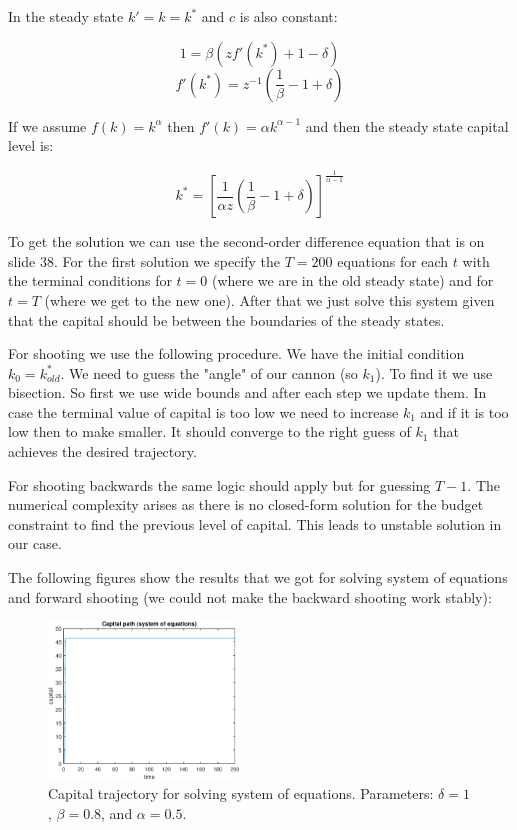\documentclass[12pt]{article}
\newcommand{\?}{\stackrel{?}{=}}
\begin{document}
In the steady state $k'=k=k^*$ and $c$ is also constant:

\[
1 = \beta (zf'(k^*) + 1 - \delta)
\]
\[
f'(k^*) = z^{-1} \left( \frac{1}{\beta} - 1 + \delta \right)
\]

If we assume $f(k) = k^\alpha$ then $f'(k) = \alpha k^{\alpha-1}$ and then the steady state capital level is:

\[
k^* = \left[ \frac{1}{\alpha z} \left( \frac{1}{\beta} - 1 + \delta \right) \right]^{\frac{1}{\alpha-1}}
\]

To get the solution we can use the second-order difference equation that is on slide 38. For the first solution we specify the $T=200$ equations for each $t$ with the terminal conditions for $t=0$ (where we are in the old steady state) and for $t=T$ (where we get to the new one). After that we just solve this system given that the capital should be between the boundaries of the steady states.

For shooting we use the following procedure. We have the initial condition $k_0 = k^*_{old}$. We need to guess the "angle" of our cannon (so $k_1$). To find it we use bisection. So first we use wide bounds and after each step we update them. In case the terminal value of capital is too low we need to increase $k_1$ and if it is too low then to make smaller. It should converge to the right guess of $k_1$ that achieves the desired trajectory.

For shooting backwards the same logic should apply but for guessing $T-1$. The numerical complexity arises as there is no closed-form solution for the budget constraint to find the previous level of capital. This leads to unstable solution in our case.

The following figures show the results that we got for solving system of equations and forward shooting (we could not make the backward shooting work stably):

\begin{figure}[H]
    \centering
    \includegraphics[width=0.45\textwidth]{PS1/2_sys.eps}
    \caption{Capital trajectory for solving system of equations. Parameters: $\delta=1$, $\beta=0.8$, and $\alpha=0.5$.}
\end{figure}
\end{document}
